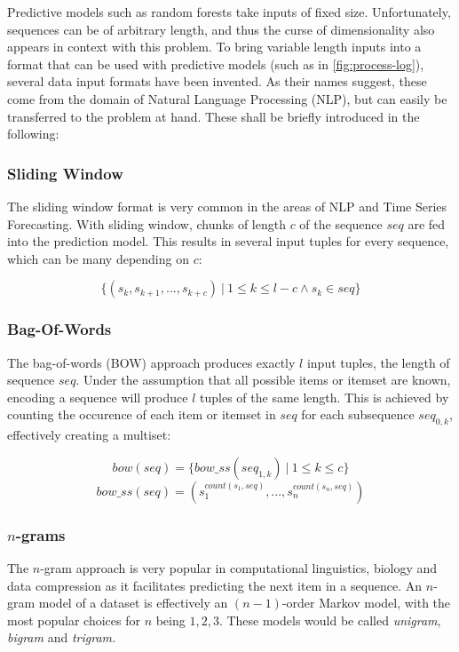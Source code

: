 Predictive models such as random forests take inputs of fixed size. Unfortunately, sequences can be of arbitrary length, and thus the curse of dimensionality also appears in context with this problem. To bring variable length inputs into a format that can be used with predictive models (such as in \autoref{fig:process-log}), several data input formats have been invented. As their names suggest, these come from the domain of Natural Language Processing (NLP), but can easily be transferred to the problem at hand. These shall be briefly introduced in the following:

\subsubsection{Sliding Window}
The sliding window format is very common in the areas of NLP and Time Series Forecasting. With sliding window, chunks of length $c$ of the sequence $seq$ are fed into the prediction model. This results in several input tuples for every sequence, which can be many depending on $c$:

\begin{equation}
    \{ (s_k, s_{k+1}, ..., s_{k+c})\ |\ 1 \leq k \leq l-c \wedge s_k \in seq \}
\end{equation}

\subsubsection{Bag-Of-Words}
The bag-of-words (BOW) approach produces exactly $l$ input tuples, the length of sequence $seq$. Under the assumption that all possible items or itemset are known, encoding a sequence will produce $l$ tuples of the same length. This is achieved by counting the occurence of each item or itemset in $seq$ for each subsequence $seq_{0,k}$, effectively creating a multiset:

\begin{equation}
    bow(seq) = \{ bow\_ss(seq_{1,k})\ |\ 1 \leq k \leq c \}
\end{equation}
\begin{equation}
    bow\_ss(seq) = ( s_1^{count(s_1,seq)}, ..., s_n^{count(s_n,seq)} )
\end{equation}

\subsubsection{$n$-grams}
The $n$-gram approach is very popular in computational linguistics, biology and data compression as it facilitates predicting the next item in a sequence. An $n$-gram model of a dataset is effectively an $(n-1)$-order Markov model, with the most popular choices for $n$ being $1,2,3$. These models would be called \textit{unigram}, \textit{bigram} and \textit{trigram.}

